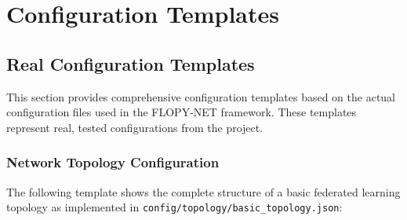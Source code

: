 \section{Configuration Templates}
\label{appendix:configuration-templates}

\subsection{Real Configuration Templates}

This section provides comprehensive configuration templates based on the actual configuration files used in the FLOPY-NET framework. These templates represent real, tested configurations from the project.

\subsubsection{Network Topology Configuration}

The following template shows the complete structure of a basic federated learning topology as implemented in \texttt{config/topology/basic\_topology.json}:

